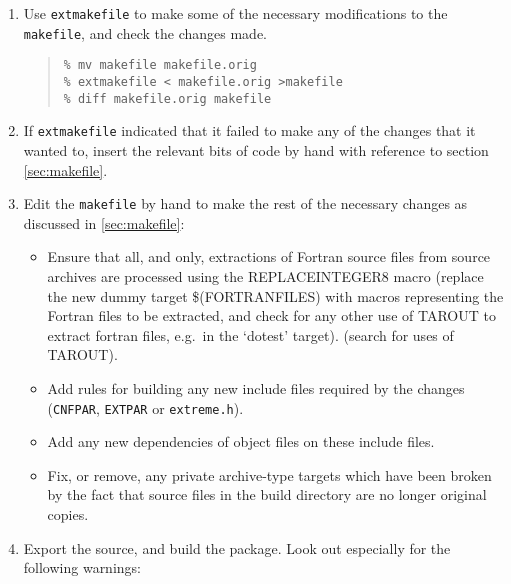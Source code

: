 \documentclass[twoside,11pt]{article}
\newcommand{\htmlref}[2]{#1}
\newcommand{\html}[1]{}
\renewcommand{\_}{\texttt{\symbol{95}}}
\newcommand{\xroutine}[1]{\htmlref{{\tt #1}}{#1}}
\newcommand{\file}[1]{{\tt #1}}
\newcommand{\routine}[1]{{\tt #1}}
\newenvironment{squote}{\begin{quote}\begin{small}}{\end{small}\end{quote}}
\begin{document}
\begin{enumerate}
\begin{squote}
\begin{verbatim}
\end{verbatim}
\end{squote}
to the new alpha\_OSF1\_64 and sun4\_Solaris\_64 stanzas of the \file{mk} file
respectively, or generate new platform-dependent files for the
two new platforms.
\html{\begin{squote}\end{squote}}
%
\item
Use \xroutine{extmakefile} to make some of the necessary modifications
to the \file{makefile}, and check the changes made.
\begin{squote}
\begin{verbatim}
% mv makefile makefile.orig
% extmakefile < makefile.orig >makefile
% diff makefile.orig makefile
\end{verbatim}
\end{squote}
%
\item
If \routine{extmakefile} indicated that it failed to make any of the
changes that it wanted to, insert the relevant bits of code by hand
with reference to section \ref{sec:makefile}.
\html{\begin{squote}\end{squote}}
%
\item
Edit the \file{makefile} by hand to make the rest of the necessary changes
as discussed in \ref{sec:makefile}:
\begin{itemize}
\item
Ensure that all, and only,
extractions of Fortran source files from source archives
are processed using the REPLACE\_INTEGER8 macro
(replace the new dummy target \$(FORTRAN\_FILES) with macros representing
the Fortran files to be extracted, and check for any other
use of TAR\_OUT to extract fortran files, e.g.\ in the `do\_test' target).
(search for uses of TAR\_OUT).
\item
Add rules for building any new include files required by the changes
(\file{CNF\_PAR}, \file{EXT\_PAR} or \file{extreme.h}).
\item
Add any new dependencies of object files on these include files.
\item
Fix, or remove, any private archive-type targets which have been broken
by the fact that source files in the build directory are no longer
original copies.
\end{itemize}
\html{\begin{squote}\end{squote}}
%
\item
Export the source, and build the package.
Look out especially for the following warnings:

\end{enumerate}
\end{document}
